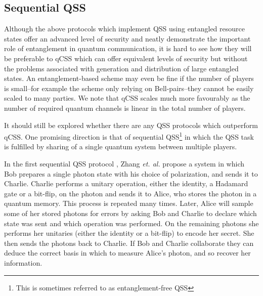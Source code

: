 


\subsection{Sequential QSS}
Although the above protocols which implement QSS using entangled resource states offer an advanced level of security and neatly demonstrate the important role of entanglement in quantum communication, it is hard to see how they will be preferable to qCSS which can offer equivalent levels of security but without the problems associated with generation and distribution of large entangled states. An entanglement-based scheme may even be fine if the number of players is small--for example the scheme \cite{Karlsson1999} only relying on Bell-pairs--they cannot be easily scaled to many parties. We note that qCSS scales much more favourably as the number of required quantum channels is linear in the total number of players.

It should still be explored whether there are any QSS protocols which outperform qCSS. One promising direction is that of sequential QSS\footnote{This is sometimes referred to as entanglement-free QSS} in which the QSS task is fulfilled by sharing of a single quantum system between multiple players.

In the first sequential QSS protocol \cite{Zhang2005}, Zhang \emph{et. al.} propose a system in which Bob prepares a single photon state with his choice of polarization, and sends it to Charlie. Charlie performs a unitary operation, either the identity, a Hadamard gate or a bit-flip, on the photon and sends it to Alice, who stores the photon in a quantum memory. This process is repeated many times. Later, Alice will sample some of her stored photons for errors by asking Bob and Charlie to declare which state was sent and which operation was performed. On the remaining photons she performs her unitaries (either the identity or a bit-flip) to encode her secret. She then sends the photons back to Charlie. %
If Bob and Charlie collaborate they can deduce the correct basis in which to measure Alice's photon, and so recover her information.



